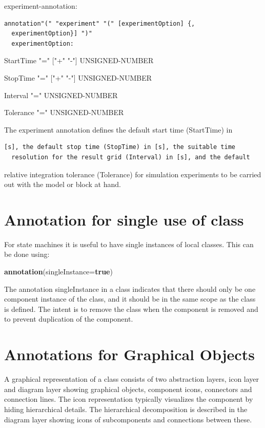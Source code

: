 \documentclass[10pt,a4paper]{report}
\def\doublelabel#1{\label{#1}\hypertarget{#1}{}}
\begin{document}
experiment-annotation:

\begin{lstlisting}[language=modelica]
  annotation"(" "experiment" "(" [experimentOption] {,
  experimentOption}] ")"
  experimentOption:
\end{lstlisting}
StartTime "=" {[}"+" \textbar{} "-"{]} UNSIGNED-NUMBER \textbar{}

StopTime "=" {[}"+" \textbar{} "-"{]} UNSIGNED-NUMBER \textbar{}

Interval "=" UNSIGNED-NUMBER

Tolerance "=" UNSIGNED-NUMBER

The experiment annotation defines the default start time (StartTime) in
\begin{lstlisting}[language=modelica]
  [s], the default stop time (StopTime) in [s], the suitable time
  resolution for the result grid (Interval) in [s], and the default
\end{lstlisting}
relative integration tolerance (Tolerance) for simulation experiments to
be carried out with the model or block at hand.

\section{Annotation for single use of class}\doublelabel{annotation-for-single-use-of-class}

For state machines it is useful to have single instances of local
classes. This can be done using:

\textbf{annotation}(singleInstance=\textbf{true})

The annotation singleInstance in a class indicates that there should
only be one component instance of the class, and it should be in the
same scope as the class is defined. The intent is to remove the class
when the component is removed and to prevent duplication of the
component.

\section{Annotations for Graphical Objects}\doublelabel{annotations-for-graphical-objects}

A graphical representation of a class consists of two abstraction
layers, icon layer and diagram layer showing graphical objects,
component icons, connectors and connection lines. The icon
representation typically visualizes the component by hiding hierarchical
details. The hierarchical decomposition is described in the diagram
layer showing icons of subcomponents and connections between these.
\end{document}
